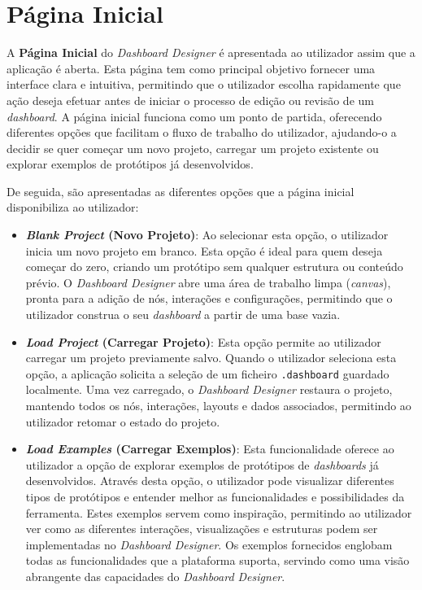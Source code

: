 \section{Página Inicial}
\label{sec:cap4_pagina_inicial}

A \textbf{Página Inicial} do \textit{Dashboard Designer} é apresentada ao utilizador assim que a aplicação é aberta. Esta página tem como principal objetivo fornecer uma interface clara e intuitiva, permitindo que o utilizador escolha rapidamente que ação deseja efetuar antes de iniciar o processo de edição ou revisão de um \textit{dashboard}. A página inicial funciona como um ponto de partida, oferecendo diferentes opções que facilitam o fluxo de trabalho do utilizador, ajudando-o a decidir se quer começar um novo projeto, carregar um projeto existente ou explorar exemplos de protótipos já desenvolvidos.

De seguida, são apresentadas as diferentes opções que a página inicial disponibiliza ao utilizador:
\begin{itemize}
    \item \textbf{\textit{Blank Project} (Novo Projeto)}: Ao selecionar esta opção, o utilizador inicia um novo projeto em branco. Esta opção é ideal para quem deseja começar do zero, criando um protótipo sem qualquer estrutura ou conteúdo prévio. O \textit{Dashboard Designer} abre uma área de trabalho limpa (\textit{canvas}), pronta para a adição de nós, interações e configurações, permitindo que o utilizador construa o seu \textit{dashboard} a partir de uma base vazia.
    
    \item \textbf{\textit{Load Project} (Carregar Projeto)}: Esta opção permite ao utilizador carregar um projeto previamente salvo. Quando o utilizador seleciona esta opção, a aplicação solicita a seleção de um ficheiro \texttt{.dashboard} guardado localmente. Uma vez carregado, o \textit{Dashboard Designer} restaura o projeto, mantendo todos os nós, interações, layouts e dados associados, permitindo ao utilizador retomar o estado do projeto.
    
    \item \textbf{\textit{Load Examples} (Carregar Exemplos)}: Esta funcionalidade oferece ao utilizador a opção de explorar exemplos de protótipos de \textit{dashboards} já desenvolvidos. Através desta opção, o utilizador pode visualizar diferentes tipos de protótipos e entender melhor as funcionalidades e possibilidades da ferramenta. Estes exemplos servem como inspiração, permitindo ao utilizador ver como as diferentes interações, visualizações e estruturas podem ser implementadas no \textit{Dashboard Designer}. Os exemplos fornecidos englobam todas as funcionalidades que a plataforma suporta, servindo como uma visão abrangente das capacidades do \textit{Dashboard Designer}.
\end{itemize}

